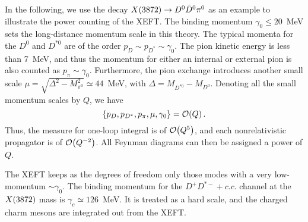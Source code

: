 In the following, we use the decay $X(3872)\to D^0\bar D^0\pi^0$ as an example to
illustrate the power counting of the XEFT. The binding momentum
$\gamma_0\leq20$~MeV sets the long-distance momentum scale in this theory.
The typical momenta for the $D^0$ and $D^{*0}$ are of the order $p_D\sim
p_{D^*}\sim\gamma_0$. The pion kinetic energy is less than 7~MeV, and thus the
momentum for either an internal or external pion is also counted as
$p_\pi\sim\gamma_0$. Furthermore, the pion exchange introduces another small
scale $\mu=\sqrt{\Delta^2-M_{\pi^0}^2}\simeq44$~MeV,  with
$\Delta=M_{D^{*0}}-M_{D^0}$. Denoting all the small momentum scales by $Q$, we
have
\begin{equation}
  \{p_D, p_{D^*}, p_\pi, \mu, \gamma_0\} =\mathcal{O}\!\left(Q\right)\!\,.
  \label{eq:XEFTpc}
\end{equation}
Thus, the measure for one-loop integral is of $\mathcal{O}\!\left(Q^5\right)\!\,$, and each 
nonrelativistic propagator is of $\mathcal{O}\!\left(Q^{-2}\right)\!\,$.
All Feynman diagrams can then be assigned a power of $Q$. 


The XEFT keeps as the degrees of freedom only those modes with a very
low-momentum $\sim\gamma_0$.
The binding momentum for the $D^+D^{*-}+c.c.$ channel at the $X(3872)$ mass is
$\gamma_c\simeq126$~MeV. It is treated as a hard scale, and the charged charm
mesons are integrated out from the XEFT.



